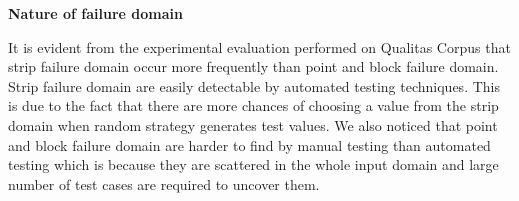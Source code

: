 \textbf{Nature of failure domain}

It is evident from the experimental evaluation performed on Qualitas Corpus that strip failure domain occur more frequently than point and block failure domain. Strip failure domain are easily detectable by automated testing techniques. This is due to the fact that there are more chances of choosing a value from the strip domain when random strategy generates test values. We also noticed that point and block failure domain are harder to find by manual testing than automated testing which is because they are scattered in the whole input domain and large number of test cases are required to uncover them. 





